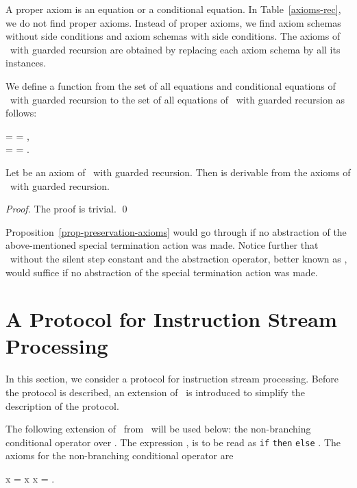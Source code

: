 \documentclass[fleqn]{llncs}
\begin{document}
A proper axiom is an equation or a conditional equation.
In Table~\ref{axioms-rec}, we do not find proper axioms.
Instead of proper axioms, we find axiom schemas without side conditions
and axiom schemas with side conditions.
The axioms of \BTA\ with guarded recursion are obtained by replacing
each axiom schema by all its instances.

We define a function  from the set of all equations and
conditional equations of \BTA\ with guarded recursion to the set of all
equations of \ACPt\ with guarded recursion as follows:
\begin{ldispl}
 \;\;=\;\;  = \;,
\\
 \;\;=\;\;
 \Implies
{} = \;.
\end{ldispl}
\begin{proposition}
\label{prop-preservation-axioms}
Let  be an axiom of \BTA\ with guarded recursion.
Then  is derivable from the axioms of \ACPt\ with guarded
recursion.
\end{proposition}
\begin{proof}
The proof is trivial.
\qed
\end{proof}
Proposition~\ref{prop-preservation-axioms} would go through if no
abstraction of the above-mentioned special termination action was made.
Notice further that \ACPt\ without the silent step constant and the
abstraction operator, better known as \ACP, would suffice if no
abstraction of the special termination action was made.

\section{A Protocol for Instruction Stream Processing}
\label{sect-protocol}

In this section, we consider a protocol for instruction stream
processing.
Before the protocol is described, an extension of \ACP\ is introduced
to simplify the description of the protocol.

The following extension of \ACP\ from~\cite{BB92c} will be used below:
the non-branching conditional operator  over
.
The expression , is to be read as
\texttt{if}  \texttt{then}  \texttt{else} .
The axioms for the non-branching conditional operator are
\begin{ldispl}
\True \gc x = x \quad {} \quad \False \gc x = \dead\;.
\end{ldispl}
\end{document}
